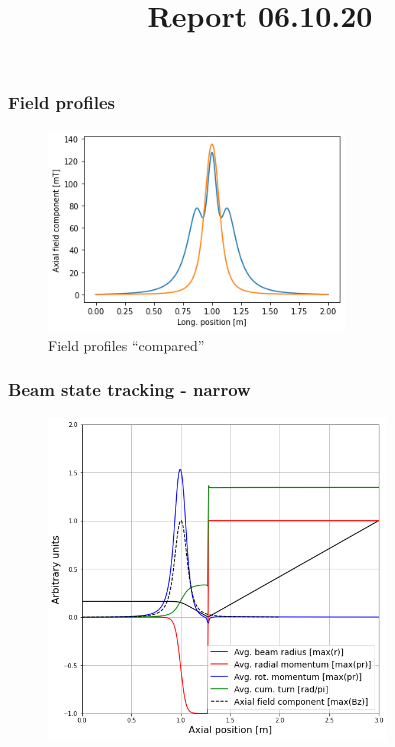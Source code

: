 \documentclass{beamer}
\title{Report 06.10.20}
\begin{document}


\begin{frame}
  \frametitle{Field profiles}
  \begin{figure}
    \includegraphics[width=0.7\textwidth]{two_fields}
    \caption{Field profiles \textquotedblleft compared\textquotedblright}
  \end{figure}
\end{frame}

\begin{frame}
  \frametitle{Beam state tracking - narrow}
  \begin{figure}
    \includegraphics[width=0.8\textwidth]{felddurchgang_narrow}
  \end{figure}
\end{frame}
\end{document}
